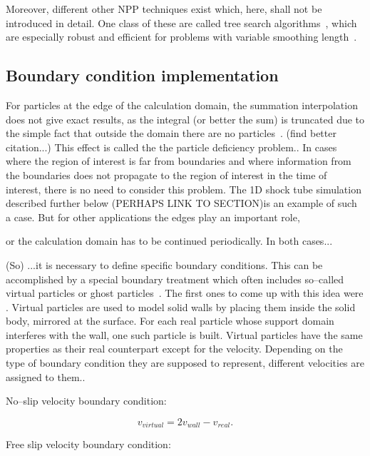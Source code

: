 \documentclass{report}
\begin{document}
Moreover, different other NPP techniques exist which, here, shall not be introduced in
detail. One class of these are called tree search algorithms~\cite{Hernquist1989}, which are
especially robust and efficient for problems with variable smoothing
length~\cite{Liu2003}.

\subsection{Boundary condition implementation}
\label{sec:boundaryConditionImplementation}
For particles at the edge of the calculation domain, the summation interpolation does not
give exact results, as the integral (or better the sum) is truncated due to
the simple fact that outside the domain there are no
particles~\cite{Liu2003}. (find better citation...) This effect is called the
the particle deficiency
problem.\cite{Liu2003}. In cases where the region of interest is far from boundaries
and where information from the boundaries does not propagate to the region of interest
in the time of interest, there is no need to consider this
problem. 
The 1D shock tube simulation described further below
(PERHAPS LINK TO SECTION)is an example of such a case.  
But for other applications the edges play an important role,

 or the calculation domain has to be continued periodically. In both cases...

(So) ...it is necessary to define specific boundary
conditions. This can be accomplished by a special boundary treatment which
often includes so--called virtual particles or ghost
particles~\cite{Liu2003}. The first ones to come up with this idea were
\cite{LIBERSKY1993}. Virtual particles are used to model solid walls by
placing them inside the solid body, mirrored at the surface. For each real
particle whose support domain interferes with the wall, one such particle is
built. Virtual particles have the same properties as their real counterpart
except for the velocity. Depending on the type of boundary condition they are
supposed to represent, different velocities are assigned to them.\cite{Hu2006}.

No--slip velocity boundary condition:

\begin{equation}
v_{virtual}=2v_{wall}-v_{real}.
\end{equation}

Free slip velocity boundary condition:
\end{document}
